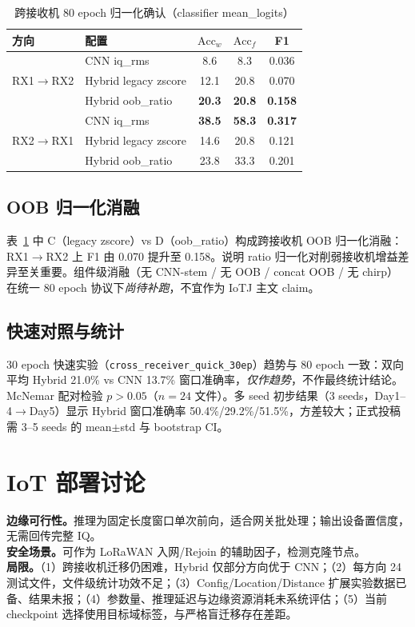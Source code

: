 \documentclass[journal]{IEEEtran}
\begin{document}
\begin{table}[!t]
\caption{跨接收机 80 epoch 归一化确认（classifier mean\_logits）}
\label{tab:crossrx}
\centering
\renewcommand{\arraystretch}{1.1}
\begin{tabular}{llccc}
\toprule
方向 & 配置 & $\mathrm{Acc}_w$ & $\mathrm{Acc}_f$ & F1 \\
\midrule
\multirow{3}{*}{RX1$\rightarrow$RX2}
 & CNN iq\_rms & 8.6 & 8.3 & 0.036 \\
 & Hybrid legacy zscore & 12.1 & 20.8 & 0.070 \\
 & Hybrid oob\_ratio & \textbf{20.3} & \textbf{20.8} & \textbf{0.158} \\
\midrule
\multirow{3}{*}{RX2$\rightarrow$RX1}
 & CNN iq\_rms & \textbf{38.5} & \textbf{58.3} & \textbf{0.317} \\
 & Hybrid legacy zscore & 14.6 & 20.8 & 0.121 \\
 & Hybrid oob\_ratio & 23.8 & 33.3 & 0.201 \\
\bottomrule
\end{tabular}
\end{table}

\subsection{OOB 归一化消融}
表~\ref{tab:crossrx} 中 C（legacy zscore）vs D（oob\_ratio）构成跨接收机 OOB 归一化消融：RX1$\rightarrow$RX2 上 F1 由 0.070 提升至 0.158。说明 ratio 归一化对削弱接收机增益差异至关重要。组件级消融（无 CNN-stem / 无 OOB / concat OOB / 无 chirp）在统一 80 epoch 协议下\emph{尚待补跑}，不宜作为 IoTJ 主文 claim。

\subsection{快速对照与统计}
30 epoch 快速实验（\texttt{cross\_receiver\_quick\_30ep}）趋势与 80 epoch 一致：双向平均 Hybrid 21.0\% vs CNN 13.7\% 窗口准确率，\emph{仅作趋势}，不作最终统计结论。McNemar 配对检验 $p>0.05$（$n=24$ 文件）。多 seed 初步结果（3 seeds，Day1--4$\rightarrow$Day5）显示 Hybrid 窗口准确率 50.4\%/29.2\%/51.5\%，方差较大；正式投稿需 3--5 seeds 的 mean$\pm$std 与 bootstrap CI。

\section{IoT 部署讨论}

\textbf{边缘可行性。}推理为固定长度窗口单次前向，适合网关批处理；输出设备置信度，无需回传完整 IQ。\\
\textbf{安全场景。}可作为 LoRaWAN 入网/Rejoin 的辅助因子，检测克隆节点。\\
\textbf{局限。}（1）跨接收机迁移仍困难，Hybrid 仅部分方向优于 CNN；（2）每方向 24 测试文件，文件级统计功效不足；（3）Config/Location/Distance 扩展实验数据已备、结果未报；（4）参数量、推理延迟与边缘资源消耗未系统评估；（5）当前 checkpoint 选择使用目标域标签，与严格盲迁移存在差距。
\end{document}
